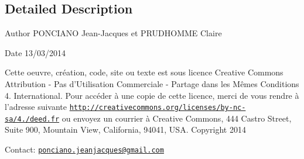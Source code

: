 \subsection{Detailed Description}
\begin{DoxyAuthor}{Author}
P\-O\-N\-C\-I\-A\-N\-O Jean-\/\-Jacques et P\-R\-U\-D\-H\-O\-M\-M\-E Claire 
\end{DoxyAuthor}
\begin{DoxyDate}{Date}
13/03/2014
\end{DoxyDate}
Cette oeuvre, création, code, site ou texte est sous licence Creative Commons Attribution -\/ Pas d’\-Utilisation Commerciale -\/ Partage dans les Mêmes Conditions 4. International. Pour accéder à une copie de cette licence, merci de vous rendre à l'adresse suivante \href{http://creativecommons.org/licenses/by-nc-sa/4.0/deed.fr}{\tt http\-://creativecommons.\-org/licenses/by-\/nc-\/sa/4./deed.\-fr} ou envoyez un courrier à Creative Commons, 444 Castro Street, Suite 900, Mountain View, California, 94041, U\-S\-A. Copyright 2014

Contact\-: \href{mailto:ponciano.jeanjacques@gmail.com}{\tt ponciano.\-jeanjacques@gmail.\-com} 

